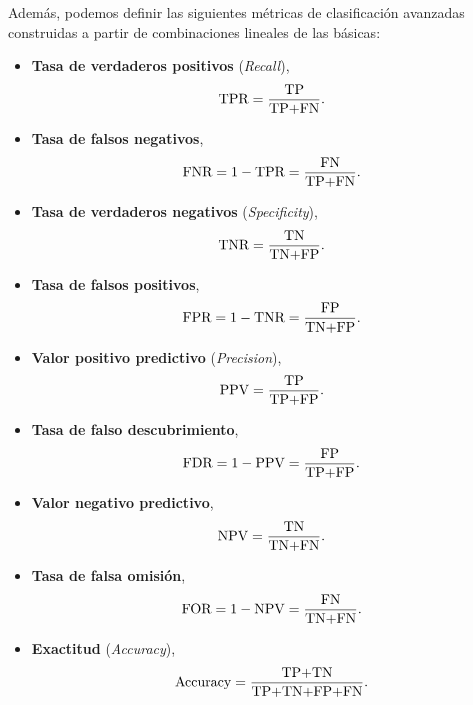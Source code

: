 \documentclass[oneside,openright,titlepage,numbers=noenddot,openany,headinclude,footinclude=true,
cleardoublepage=empty,abstractoff,BCOR=5mm,paper=a4,fontsize=12pt,main=spanish]{scrreprt}
\begin{document}
Además, podemos definir las siguientes métricas de clasificación avanzadas construidas a partir de combinaciones lineales de las básicas:\\

\begin{itemize}
    \item \textbf{Tasa de verdaderos positivos} (\textit{Recall}), $$\text{TPR}=\frac{\displaystyle \text{TP}}{\displaystyle \text{TP+FN}}.$$
    \item \textbf{Tasa de falsos negativos}, $$\text{FNR}=1-\text{TPR}=\frac{\displaystyle \text{FN}}{\displaystyle \text{TP+FN}}.$$
    \item \textbf{Tasa de verdaderos negativos} (\textit{Specificity}), $$\text{TNR}=\frac{\displaystyle \text{TN}}{\displaystyle \text{TN+FP}}.$$
    \item \textbf{Tasa de falsos positivos}, $$\text{FPR}=1-\text{TNR}=\frac{\displaystyle \text{FP}}{\displaystyle \text{TN+FP}}.$$
    \item \textbf{Valor positivo predictivo} (\textit{Precision}),  $$\text{PPV}=\frac{\displaystyle \text{TP}}{\displaystyle \text{TP+FP}}.$$
    \item \textbf{Tasa de falso descubrimiento}, $$\text{FDR}=1-\text{PPV}=\frac{\displaystyle \text{FP}}{\displaystyle \text{TP+FP}}.$$
    \item \textbf{Valor negativo predictivo}, $$\text{NPV}=\frac{\displaystyle \text{TN}}{\displaystyle \text{TN+FN}}.$$
    \item \textbf{Tasa de falsa omisión}, $$\text{FOR}=1-\text{NPV}=\frac{\displaystyle \text{FN}}{\displaystyle \text{TN+FN}}.$$
    \item \textbf{Exactitud} (\textit{Accuracy}), $$\text{Accuracy}=\frac{\displaystyle \text{TP+TN}}{\displaystyle \text{TP+TN+FP+FN}}.$$
\end{itemize}\
\end{document}
